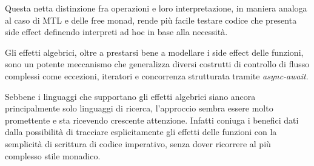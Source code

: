 Questa netta distinzione fra operazioni e loro interpretazione, in maniera analoga al caso di MTL e delle free monad, rende più facile testare codice che presenta side effect definendo interpreti ad hoc in base alla necessità.

Gli effetti algebrici, oltre a prestarsi bene a modellare i side effect delle funzioni, sono un potente meccanismo che generalizza diversi costrutti di controllo di flusso complessi come eccezioni, iteratori e concorrenza strutturata tramite \emph{async-await}.

Sebbene i linguaggi che supportano gli effetti algebrici siano ancora principalmente solo linguaggi di ricerca, l'approccio sembra essere molto promettente e sta ricevendo crescente attenzione. Infatti coniuga i benefici dati dalla possibilità di tracciare esplicitamente gli effetti delle funzioni con la semplicità di scrittura di codice imperativo, senza dover ricorrere al più complesso stile monadico.
